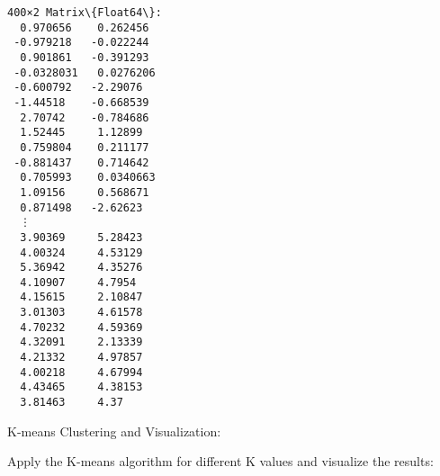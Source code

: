 \documentclass[11pt]{article}
\makeatletter
\newcommand{\boxspacing}{\kern\kvtcb@left@rule\kern\kvtcb@boxsep}
\newcommand{\prompt}[4]{
        {\ttfamily\llap{{\color{#2}[#3]:\hspace{3pt}#4}}\vspace{-\baselineskip}}
    }
\makeatother
\begin{document}
            \begin{tcolorbox}[breakable, size=fbox, boxrule=.5pt, pad at break*=1mm, opacityfill=0]
\prompt{Out}{outcolor}{8}{\boxspacing}
\begin{Verbatim}[commandchars=\\\{\}]
400×2 Matrix\{Float64\}:
  0.970656    0.262456
 -0.979218   -0.022244
  0.901861   -0.391293
 -0.0328031   0.0276206
 -0.600792   -2.29076
 -1.44518    -0.668539
  2.70742    -0.784686
  1.52445     1.12899
  0.759804    0.211177
 -0.881437    0.714642
  0.705993    0.0340663
  1.09156     0.568671
  0.871498   -2.62623
  ⋮
  3.90369     5.28423
  4.00324     4.53129
  5.36942     4.35276
  4.10907     4.7954
  4.15615     2.10847
  3.01303     4.61578
  4.70232     4.59369
  4.32091     2.13339
  4.21332     4.97857
  4.00218     4.67994
  4.43465     4.38153
  3.81463     4.37
\end{Verbatim}
\end{tcolorbox}
        
    {K-means Clustering and Visualization:}

Apply the K-means algorithm for different K values and visualize the
results:
\end{document}
